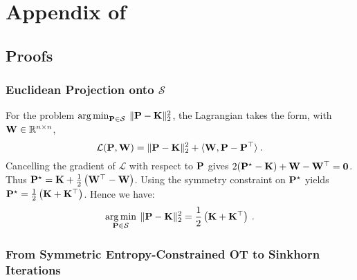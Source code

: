 \chapter{Appendix of }

\minitoc

\section{Proofs}

\subsection{Euclidean Projection onto $\mathcal{S}$}\label{sec:sym_proj}

For the problem $\operatorname*{arg\,min}_{{\mathbf{P}} \in \mathcal{S}} \: \| {\mathbf{P}} - {\mathbf{K}} \|_2^2$, the Lagrangian takes the form, with $\mathbf{W} \in \mathbb{R}^{n \times n}$,
\begin{equation}
\mathcal{L}({\mathbf{P}}, \mathbf{W}) = \| {\mathbf{P}} - {\mathbf{K}} \|_2^2 +\langle \mathbf{W}, {\mathbf{P}} -{\mathbf{P}}^{\top} \rangle \:.
\end{equation}
Cancelling the gradient of $\mathcal{L}$ with respect to ${\mathbf{P}}$ gives $2({\mathbf{P}}^\star - {\mathbf{K}}) + \mathbf{W} - \mathbf{W}^\top = \bm{0}$. Thus ${\mathbf{P}}^\star = {\mathbf{K}} + \frac{1}{2} \left(\mathbf{W}^\top - \mathbf{W} \right)$. Using the symmetry constraint on ${\mathbf{P}}^\star$ yields ${\mathbf{P}}^\star = \frac{1}{2} \left({\mathbf{K}} + {\mathbf{K}}^\top \right)$.
Hence we have:
\begin{equation}
\operatorname*{arg\,min}_{{\mathbf{P}} \in \mathcal{S}} \: \| {\mathbf{P}} -  {\mathbf{K}} \|_2^2 = \frac{1}{2} \left({\mathbf{K}} + {\mathbf{K}}^\top \right) \:.
\end{equation}

\subsection{From Symmetric Entropy-Constrained OT to Sinkhorn Iterations}\label{sec:proof_sinkhorn}

